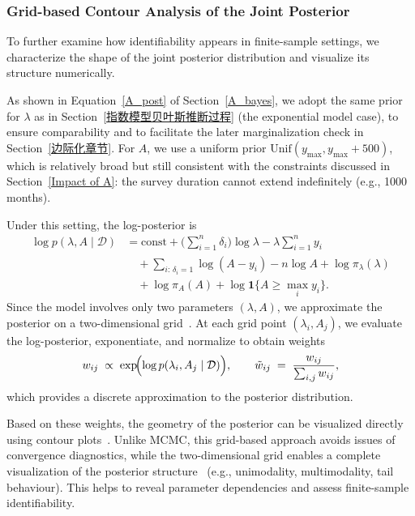 \subsubsection{Grid-based Contour Analysis of the Joint Posterior}
\label{sec: Contour Joint Posterior}
To further examine how identifiability appears in finite-sample settings, we characterize the shape of the joint posterior distribution and visualize its structure numerically.

As shown in Equation~\eqref{A_post} of Section~\ref{A_bayes}, we adopt the same prior for $\lambda$ as in Section~\ref{指数模型贝叶斯推断过程} (the exponential model case), to ensure comparability and to facilitate the later marginalization check in Section~\ref{边际化章节}. For $A$, we use a uniform prior $\mathrm{Unif}(y_{\max}, y_{\max}+500)$, which is relatively broad but still consistent with the constraints discussed in Section~\ref{Impact of A}: the survey duration cannot extend indefinitely (e.g., 1000 months).

Under this setting, the log-posterior is
\begin{align}
\log p(\lambda, A \mid \mathcal D)
&= \text{const}
   + \Big(\sum_{i=1}^n \delta_i\Big)\log \lambda
   - \lambda \sum_{i=1}^n y_i \nonumber\\[6pt]
&\quad + \sum_{i:\,\delta_i=1}\log(A-y_i)
   - n \log A
   + \log \pi_\lambda(\lambda) \nonumber \\[6pt]
&\quad + \log \pi_A(A) + \log \mathbf 1\{A \ge \max_i y_i\}.
\end{align}
Since the model involves only two parameters $(\lambda, A)$, we approximate the posterior on a two-dimensional grid~\cite{mcelreath2021grid}. At each grid point $(\lambda_i, A_j)$, we evaluate the log-posterior, exponentiate, and normalize to obtain weights~\cite{ORMEROD201145,mcelreath2021grid}
\begin{equation}
    w_{ij} \;\propto\; \exp\!\Bigl(\log p(\lambda_i, A_j \mid \mathcal D)\Bigr), \qquad \tilde w_{ij} \;=\; \frac{w_{ij}}{\sum_{i,j} w_{ij}} ,
\end{equation}
which provides a discrete approximation to the posterior distribution.

Based on these weights, the geometry of the posterior can be visualized directly using contour plots~\cite{maclaren2020estimatedidentifiabilityestimabilitycausal, mcelreath2021grid}. Unlike MCMC, this grid-based approach avoids issues of convergence diagnostics, while the two-dimensional grid enables a complete visualization of the posterior structure~\cite{joshi2016improvinggridbasedbayesian} (e.g., unimodality, multimodality, tail behaviour). This helps to reveal parameter dependencies and assess finite-sample identifiability.

